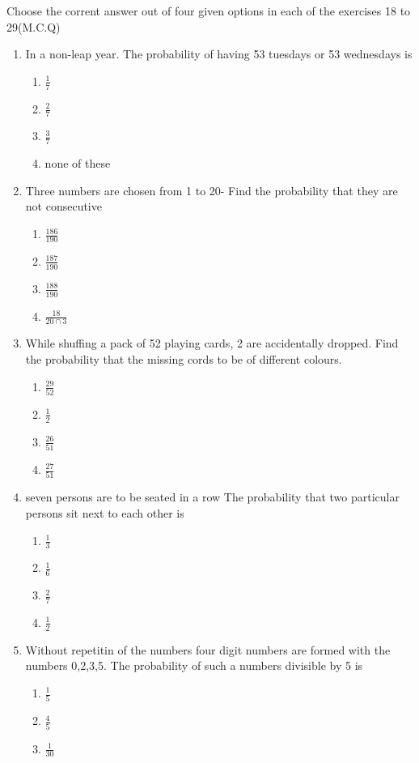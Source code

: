 \documentclass[12pt]{article}
\begin{document}
Choose the corrent answer out of four given options in each of the exercises 18 to 29(M.C.Q)
\begin{enumerate}[resume]
\item In a non-leap year. The probability of having 53 tuesdays or 53 wednesdays is
\begin{enumerate}
\item $\frac{1}{7}$
\item $\frac{2}{7}$
\item $\frac{3}{7}$
\item none of these
\end{enumerate}
\item Three numbers are chosen from 1 to 20- Find the probability that they are not consecutive
\begin{enumerate}
\item $\frac{186}{190}$
\item $\frac{187}{190}$
\item $\frac{188}{190}$
\item $\frac{18}{20\cap3}$
\end{enumerate}
\item While shuffing a pack of 52 playing cards, 2 are accidentally dropped. Find the probability that the missing cords to be of different colours.
\begin{enumerate}
\item $\frac{29}{52}$
\item $\frac{1}{2}$
\item $\frac{26}{51}$
\item $\frac{27}{51}$
\end{enumerate}
\item seven persons are to be seated in a row The probability that two particular persons sit next to each other is
\begin{enumerate}
\item $\frac{1}{3}$
\item $\frac{1}{6}$
\item $\frac{2}{7}$
\item $\frac{1}{2}$
\end{enumerate}
\item Without repetitin of the numbers four digit numbers are  formed with the numbers 0,2,3,5. The probability of such a numbers divisible by 5 is
\begin{enumerate}
\item $\frac{1}{5}$
\item $\frac{4}{5}$
\item $\frac{1}{30}$

\end{enumerate}
\end{enumerate}
\end{document}
